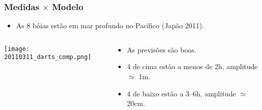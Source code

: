 \documentclass{beamer}
\begin{document}
\begin{frame}
  \frametitle{Medidas $\times$ Modelo}
  \begin{itemize}\setlength{\itemsep}{0ex}
  \item As 8 bóias estão em mar profundo no Pacífico (Japão 2011).
  \end{itemize}
  \begin{columns}
    \begin{column}{0.6\paperwidth}
      \texttt{[image: 20110311\_darts\_comp.png]}
    \end{column}
    \hspace{0.01\paperwidth}
    \begin{column}{0.3\paperwidth}
      \begin{itemize}\setlength{\itemsep}{2ex}
      \item \alert{As previsões são boas.}
      \item 4 de cima estão a menos de 2h, amplitude $\simeq$ 1m.
      \item 4 de baixo estão a 3--6h, amplitude $\simeq$ 20cm.
      \end{itemize}
    \end{column}
  \end{columns}
\end{frame}
\end{document}
